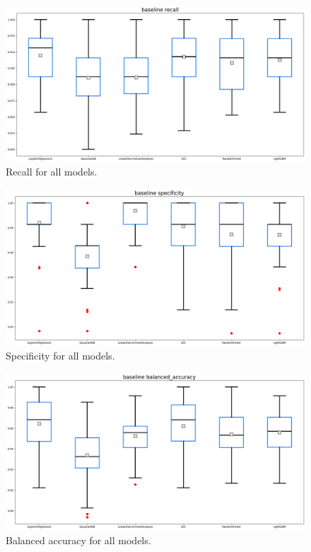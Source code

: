 \documentclass[12pt]{article}
\begin{document}
\begin{figure}[H]
    \centering
    \includegraphics[width=\textwidth]{ims/baseline_recall.png}
    \caption{Recall for all models.}
    \label{fig:baseline_recall}
\end{figure}

\begin{figure}[H]
    \centering
    \includegraphics[width=\textwidth]{ims/baseline_specificity.png}
    \caption{Specificity for all models.}
    \label{fig:baseline_specificity}
\end{figure}

\begin{figure}[H]
    \centering
    \includegraphics[width=\textwidth]{ims/baseline_balanced_accuracy.png}
    \caption{Balanced accuracy for all models.}
    \label{fig:baseline_balanced_accuracy}
\end{figure}
\end{document}
